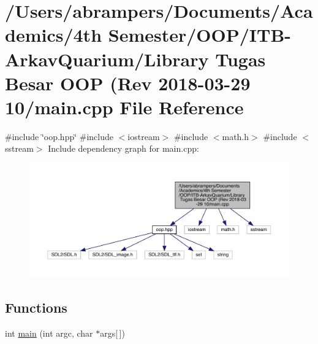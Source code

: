 \hypertarget{_library_01_tugas_01_besar_01_o_o_p_01_07_rev_012018-03-29_0110_2main_8cpp}{}\section{/\+Users/abrampers/\+Documents/\+Academics/4th Semester/\+O\+O\+P/\+I\+T\+B-\/\+Arkav\+Quarium/\+Library Tugas Besar O\+OP (Rev 2018-\/03-\/29 10/main.cpp File Reference}
\label{_library_01_tugas_01_besar_01_o_o_p_01_07_rev_012018-03-29_0110_2main_8cpp}
{\ttfamily \#include \char`\"{}oop.\+hpp\char`\"{}}\newline
{\ttfamily \#include $<$iostream$>$}\newline
{\ttfamily \#include $<$math.\+h$>$}\newline
{\ttfamily \#include $<$sstream$>$}\newline
Include dependency graph for main.\+cpp\+:\nopagebreak
\begin{figure}[H]
\begin{center}
\leavevmode
\includegraphics[width=350pt]{_library_01_tugas_01_besar_01_o_o_p_01_07_rev_012018-03-29_0110_2main_8cpp__incl}
\end{center}
\end{figure}
\subsection*{Functions}
\begin{DoxyCompactItemize}
\item 
int \mbox{\hyperlink{_library_01_tugas_01_besar_01_o_o_p_01_07_rev_012018-03-29_0110_2main_8cpp_a700a0caa5b70a06d1064e576f9f3cf65}{main}} (int argc, char $\ast$args\mbox{[}$\,$\mbox{]})
\end{DoxyCompactItemize}
